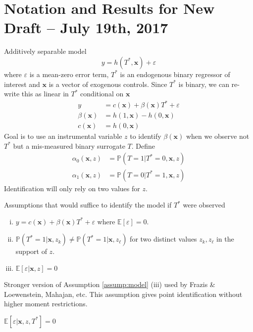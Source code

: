 \documentclass[12pt]{article}
\begin{document}

\section{Notation and Results for New Draft -- July 19th, 2017}


Additively separable model
\[
  y = h(T^*,\mathbf{x})+\varepsilon
\]
where $\varepsilon$ is a mean-zero error term, $T^*$ is an endogenous binary regressor of interest and $\mathbf{x}$ is a vector of exogenous controls.
Since $T^*$ is binary, we can re-write this as linear in $T^*$ conditional on $\mathbf{x}$
\begin{align*}
  y &= c(\mathbf{x}) + \beta(\mathbf{x}) T^* + \varepsilon\\
  \beta(\mathbf{x}) &= h(1,\mathbf{x}) - h(0,\mathbf{x})\\
  c(\mathbf{x}) &= h(0,\mathbf{x})
\end{align*}
Goal is to use an instrumental variable $z$ to identify $\beta(\mathbf{x})$ when we observe not $T^*$ but a mis-measured binary surrogate $T$. 
Define
\begin{align*}
  \alpha_0(\mathbf{x},z) &= \mathbb{P}\left(T=1|T^*=0,\mathbf{x},z  \right)\\
  \alpha_1(\mathbf{x},z) &= \mathbb{P}\left(T=0|T^*=1,\mathbf{x},z  \right)
\end{align*}
Identification will only rely on two values for $z$.

\noindent Assumptions that would suffice to identify the model if $T^*$ were observed
\begin{assump} \mbox{}
  \label{assump:model}
  \begin{enumerate}[(i)] 
    \item $y = c(\mathbf{x}) + \beta(\mathbf{x})T^* + \varepsilon$ where $\mathbb{E}[\varepsilon]=0$.
    \item $\mathbb{P}(T^*=1|\mathbf{x},z_k) \neq \mathbb{P}(T^*=1|\mathbf{x},z_\ell)$ for two distinct values $z_k, z_\ell$ in the support of $z$.
    \item $\mathbb{E}[\varepsilon|\mathbf{x},z] = 0$
  \end{enumerate}
\end{assump}

\noindent Stronger version of Assumption \ref{assump:model} (iii) used by Frazis \& Loewenstein, Mahajan, etc.
This assumption gives point identification without higher moment restrictions.
\begin{assump} \mbox{}
  \label{assump:jointExog}
    $\mathbb{E}[\varepsilon|\mathbf{x},z, T^*] = 0$
\end{assump}
\end{document}
